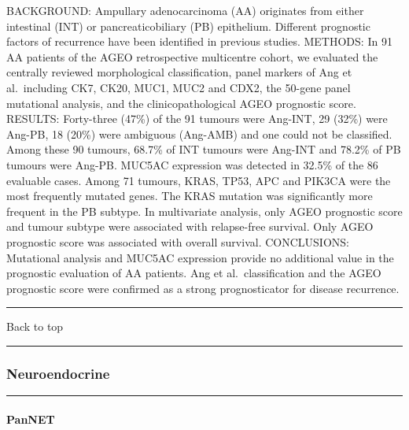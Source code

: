 \documentclass[]{article}
\let\oldparagraph\paragraph
\renewcommand{\paragraph}[1]{\oldparagraph{#1}\mbox{}}
\begin{document}
BACKGROUND: Ampullary adenocarcinoma (AA) originates from either
intestinal (INT) or pancreaticobiliary (PB) epithelium. Different
prognostic factors of recurrence have been identified in previous
studies. METHODS: In 91 AA patients of the AGEO retrospective
multicentre cohort, we evaluated the centrally reviewed morphological
classification, panel markers of Ang et al.~including CK7, CK20, MUC1,
MUC2 and CDX2, the 50-gene panel mutational analysis, and the
clinicopathological AGEO prognostic score. RESULTS: Forty-three (47\%)
of the 91 tumours were Ang-INT, 29 (32\%) were Ang-PB, 18 (20\%) were
ambiguous (Ang-AMB) and one could not be classified. Among these 90
tumours, 68.7\% of INT tumours were Ang-INT and 78.2\% of PB tumours
were Ang-PB. MUC5AC expression was detected in 32.5\% of the 86
evaluable cases. Among 71 tumours, KRAS, TP53, APC and PIK3CA were the
most frequently mutated genes. The KRAS mutation was significantly more
frequent in the PB subtype. In multivariate analysis, only AGEO
prognostic score and tumour subtype were associated with relapse-free
survival. Only AGEO prognostic score was associated with overall
survival. CONCLUSIONS: Mutational analysis and MUC5AC expression provide
no additional value in the prognostic evaluation of AA patients. Ang et
al.~classification and the AGEO prognostic score were confirmed as a
strong prognosticator for disease recurrence.

{}

{}

\begin{center}\rule{0.5\linewidth}{\linethickness}\end{center}

Back to top

\begin{center}\rule{0.5\linewidth}{\linethickness}\end{center}

\pagebreak

\hypertarget{neuroendocrine}{%
\subsubsection{Neuroendocrine}\label{neuroendocrine}}

\begin{center}\rule{0.5\linewidth}{\linethickness}\end{center}

\hypertarget{pannet}{%
\paragraph{PanNET}\label{pannet}}
\end{document}
